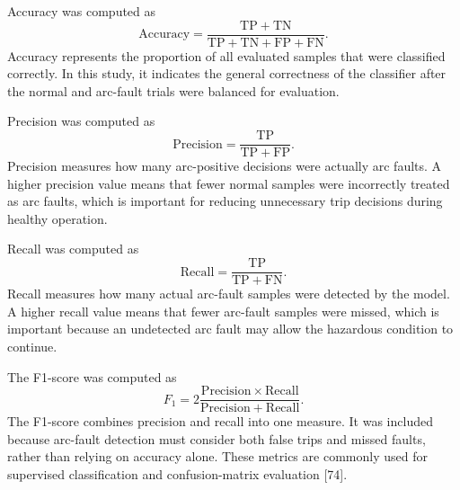 Accuracy was computed as
\begin{equation}
  \mathrm{Accuracy} =
  \frac{\mathrm{TP}+\mathrm{TN}}
       {\mathrm{TP}+\mathrm{TN}+\mathrm{FP}+\mathrm{FN}}.
  \label{eq:metric-accuracy}
\end{equation}
Accuracy represents the proportion of all evaluated samples that were classified
correctly. In this study, it indicates the general correctness of the classifier
after the normal and arc-fault trials were balanced for evaluation.

Precision was computed as
\begin{equation}
  \mathrm{Precision} =
  \frac{\mathrm{TP}}{\mathrm{TP}+\mathrm{FP}}.
  \label{eq:metric-precision}
\end{equation}
Precision measures how many arc-positive decisions were actually arc faults. A
higher precision value means that fewer normal samples were incorrectly treated
as arc faults, which is important for reducing unnecessary trip decisions during
healthy operation.

Recall was computed as
\begin{equation}
  \mathrm{Recall} =
  \frac{\mathrm{TP}}{\mathrm{TP}+\mathrm{FN}}.
  \label{eq:metric-recall}
\end{equation}
Recall measures how many actual arc-fault samples were detected by the model. A
higher recall value means that fewer arc-fault samples were missed, which is
important because an undetected arc fault may allow the hazardous condition to
continue.

The F1-score was computed as
\begin{equation}
  F_1 =
  2\frac{\mathrm{Precision}\times\mathrm{Recall}}
        {\mathrm{Precision}+\mathrm{Recall}}.
  \label{eq:metric-f1}
\end{equation}
The F1-score combines precision and recall into one measure. It was included
because arc-fault detection must consider both false trips and missed faults,
rather than relying on accuracy alone. These metrics are commonly used for
supervised classification and confusion-matrix evaluation [74].